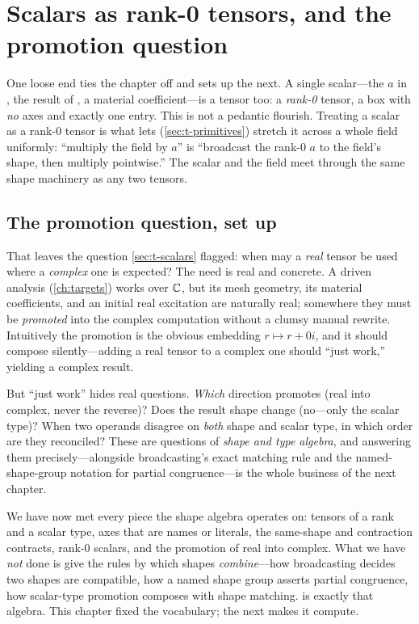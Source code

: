 \section{Scalars as rank-0 tensors, and the promotion question}
\label{sec:t-scalars-rank0}

One loose end ties the chapter off and sets up the next. A single
scalar---the $a$ in , the result of , a material
coefficient---is a tensor too: a \emph{rank-0} tensor, a box with \emph{no} axes
and exactly one entry. This is not a pedantic flourish. Treating a scalar as a
rank-0 tensor is what lets  (\cref{sec:t-primitives}) stretch it
across a whole field uniformly: ``multiply the field by $a$'' is ``broadcast the
rank-0 $a$ to the field's shape, then multiply pointwise.'' The scalar and the
field meet through the same shape machinery as any two tensors.

\subsection{The promotion question, set up}
\label{sec:t-promotion}

That leaves the question \cref{sec:t-scalars} flagged: when may a \emph{real}
tensor be used where a \emph{complex} one is expected? The need is real and
concrete. A driven analysis (\cref{ch:targets}) works over $\mathbb{C}$, but its
mesh geometry, its material coefficients, and an initial real excitation are
naturally real; somewhere they must be \emph{promoted} into the complex
computation without a clumsy manual rewrite. Intuitively the promotion is the
obvious embedding $r \mapsto r + 0i$, and it should compose silently---adding a
real tensor to a complex one should ``just work,'' yielding a complex result.

But ``just work'' hides real questions. \emph{Which} direction promotes (real
into complex, never the reverse)? Does the result shape change (no---only the
scalar type)? When two operands disagree on \emph{both} shape and scalar type, in
which order are they reconciled? These are questions of \emph{shape and type
algebra}, and answering them precisely---alongside broadcasting's exact matching
rule and the named-shape-group notation for partial congruence---is the whole
business of the next chapter.

\begin{notationbox}
We have now met every piece the shape algebra operates on: tensors of a rank and
a scalar type, axes that are names or literals, the same-shape and contraction
contracts, rank-0 scalars, and the promotion of real into complex. What we have
\emph{not} done is give the rules by which shapes \emph{combine}---how broadcasting
decides two shapes are compatible, how a named shape group asserts partial
congruence, how scalar-type promotion composes with shape matching.
 is exactly that algebra. This chapter fixed the vocabulary; the
next makes it compute.
\end{notationbox}

